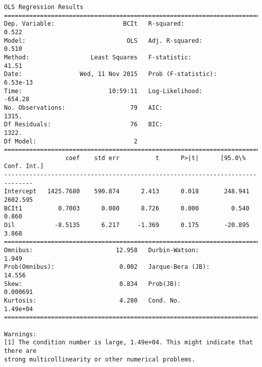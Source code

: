 \documentclass{article}
\begin{document}
    \begin{Verbatim}[commandchars=\\\{\}]
OLS Regression Results                            
==============================================================================
Dep. Variable:                   BCIt   R-squared:                       0.522
Model:                            OLS   Adj. R-squared:                  0.510
Method:                 Least Squares   F-statistic:                     41.51
Date:                Wed, 11 Nov 2015   Prob (F-statistic):           6.53e-13
Time:                        10:59:11   Log-Likelihood:                -654.28
No. Observations:                  79   AIC:                             1315.
Df Residuals:                      76   BIC:                             1322.
Df Model:                           2                                         
==============================================================================
                 coef    std err          t      P>|t|      [95.0\% Conf. Int.]
------------------------------------------------------------------------------
Intercept   1425.7680    590.874      2.413      0.018       248.941  2602.595
BCIt1          0.7003      0.080      8.726      0.000         0.540     0.860
Oil           -8.5135      6.217     -1.369      0.175       -20.895     3.868
==============================================================================
Omnibus:                       12.958   Durbin-Watson:                   1.949
Prob(Omnibus):                  0.002   Jarque-Bera (JB):               14.556
Skew:                           0.834   Prob(JB):                     0.000691
Kurtosis:                       4.280   Cond. No.                     1.49e+04
==============================================================================

Warnings:
[1] The condition number is large, 1.49e+04. This might indicate that there are
strong multicollinearity or other numerical problems.
    \end{Verbatim}
\end{document}
